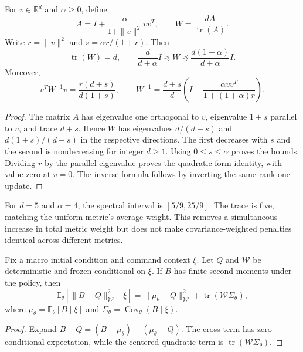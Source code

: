 \begin{proposition}
\label{prop:tr-metric}
For $v\in\mathbb R^d$ and $\alpha\ge0$, define
\begin{equation}
 A=I+\frac{\alpha}{1+\|v\|^2}vv^T,\qquad
 W=\frac{dA}{\operatorname{tr}(A)}.
 \label{eq:tr-metric}
\end{equation}
Write $r=\|v\|^2$ and $s=\alpha r/(1+r)$. Then
\begin{equation}
 \operatorname{tr}(W)=d,\qquad
 \frac{d}{d+\alpha}I\preceq W
 \preceq\frac{d(1+\alpha)}{d+\alpha}I.
 \label{eq:tr-metric-bounds}
\end{equation}
Moreover,
\begin{equation}
 v^TW^{-1}v=\frac{r(d+s)}{d(1+s)},\qquad
 W^{-1}=\frac{d+s}{d}\left(I-
 \frac{\alpha vv^T}{1+(1+\alpha)r}\right).
 \label{eq:tr-dualnorm}
\end{equation}
\end{proposition}
\begin{proof}
The matrix $A$ has eigenvalue one orthogonal to $v$, eigenvalue $1+s$
parallel to $v$, and trace $d+s$. Hence $W$ has eigenvalues $d/(d+s)$
and $d(1+s)/(d+s)$ in the respective directions. The first decreases
with $s$ and the second is nondecreasing for integer $d\ge1$.
Using $0\le s\le\alpha$ proves the bounds. Dividing $r$ by the parallel
eigenvalue proves the quadratic-form identity, with value zero at $v=0$.
The inverse formula follows by inverting the same rank-one update.
\end{proof}
For $d=5$ and $\alpha=4$, the spectral interval is $[5/9,25/9]$.
The trace is five, matching the uniform metric's average weight.
This removes a simultaneous increase in total metric weight but does not
make covariance-weighted penalties identical across different metrics.

\begin{proposition}
\label{prop:tr-variance}
Fix a macro initial condition and command context $\xi$. Let $Q$ and
$\mathcal W$ be deterministic and frozen conditional on $\xi$. If $B$
has finite second moments under the policy, then
\begin{equation}
 \mathbb E_\theta[\|B-Q\|_{\mathcal W}^2\mid\xi]
 =\|\mu_\theta-Q\|_{\mathcal W}^2
  +\operatorname{tr}(\mathcal W\Sigma_\theta),
 \label{eq:tr-variance}
\end{equation}
where $\mu_\theta=\mathbb E_\theta[B\mid\xi]$ and
$\Sigma_\theta=\operatorname{Cov}_\theta(B\mid\xi)$.
\end{proposition}
\begin{proof}
Expand $B-Q=(B-\mu_\theta)+(\mu_\theta-Q)$. The cross term has zero
conditional expectation, while the centered quadratic term is
$\operatorname{tr}(\mathcal W\Sigma_\theta)$.
\end{proof}

